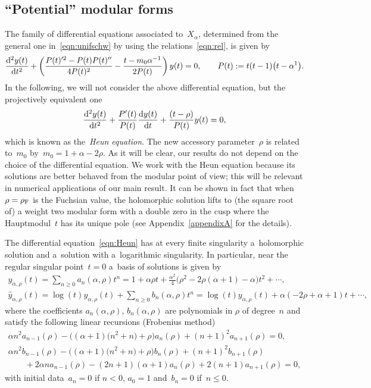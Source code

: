 \documentclass[pdftex]{sigma}
\numberwithin{equation}{section}
\begin{document}
\subsection{``Potential'' modular forms}\label{sec:cons}
The family of differential equations associated to~$X_\alpha$, determined from the general one in~\eqref{eqn:unifschw} by using the relations~\eqref{eqn:rel}, is given by
\[
\frac{{\rm d}^2y(t)}{{\rm d}t^2} + \left(\frac{P(t)'^2-P(t)P(t)''}{4P(t)^2}-\frac{t-m_0\alpha^{-1}}{2P(t)}\right)y(t)=0 ,\qquad P(t):=t(t-1)\big(t-\alpha^{1}\big) .
\]
In the following, we will not consider the above differential equation, but the projectively equivalent one
\begin{equation}\label{eqn:Heun}
\frac{{\rm d}^2y(t)}{{\rm d}t^2}+\frac{P'(t)}{P(t)}\frac{{\rm d}y(t)}{{\rm d}t}+\frac{(t-\rho)}{P(t)}y(t)=0,
\end{equation}
which is known as the~\emph{Heun equation}. The new accessory parameter~$\rho$ is related to~$m_0$ by~$m_0=1+\alpha-2\rho$.
As it will be clear, our results do not depend on the choice of the differential equation. We work with the Heun equation because its solutions are better behaved from the modular point of view; this will be relevant in numerical applications of our main result. It can be shown in fact that when~$\rho=\rho_{\rm F}$ is the Fuchsian value, the holomorphic solution lifts to (the square root of) a weight two modular form with a double zero in the cusp where the Hauptmodul~$t$ has its unique pole (see Appendix~\ref{appendixA} for the details).

The differential equation~\eqref{eqn:Heun} has at every finite singularity a~holomorphic solution and a~solution with a~logarithmic singularity. In particular, near the regular singular point~$t=0$ a~basis of solutions is given by
\begin{gather*}
y_{\alpha,\rho}(t)= \sum_{n\ge 0}{a_n(\alpha,\rho)t^n}= 1+\alpha\rho{t}+\frac{\alpha^2}{4}\big(\rho^2-2\rho(\alpha+1)-\alpha\big)t^2+\cdots, \\
\hat{y}_{\alpha,\rho}(t)= \log(t)y_{\alpha,\rho}(t) + \sum_{n\ge 0}{b_n(\alpha,\rho)t^n}= \log(t)y_{\alpha,\rho}(t)+\alpha(-2\rho+\alpha+1)t+\cdots ,
\end{gather*}
where the coefficients $a_n(\alpha,\rho)$, $b_n(\alpha,\rho)$ are polynomials in $\rho$ of degree~$n$ and satisfy the following linear recursions (Frobenius method)
\begin{gather*}
\alpha n^2a_{n-1}(\rho)-\big((\alpha+1)\big(n^2+n\big)+\rho\big)a_n(\rho)+(n+1)^2a_{n+1}(\rho)=0,
\\
\alpha n^2b_{n-1}(\rho)-\big((\alpha+1)\big(n^2+n\big)+\rho\big)b_n(\rho)+(n+1)^2b_{n+1}(\rho)\\
\qquad{} +2\alpha na_{n-1}(\rho)-(2n+1)(\alpha+1)a_n(\rho)+2(n+1)a_{n+1}(\rho)=0,
\end{gather*}
with initial data~$a_n=0$ if $n<0$, $a_0=1$ and~$b_n=0$ if~$n\le 0$.
\end{document}
